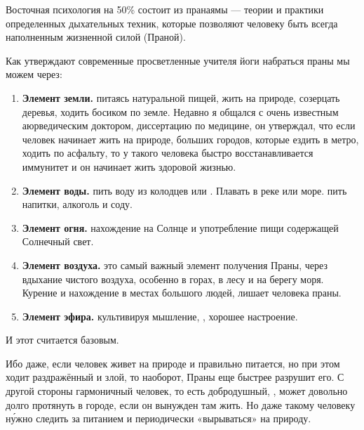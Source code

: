 Восточная психология на 50\% состоит из пранаямы --- теории и практики определенных дыхательных техник, которые позволяют человеку быть всегда наполненным жизненной силой (Праной).

Как утверждают современные просветленные учителя йоги набраться праны мы можем через:
\begin{enumerate}
    \item \textbf{Элемент земли.} питаясь натуральной пищей, жить на природе, созерцать деревья, ходить босиком по земле. Недавно я общался с очень известным аюрведическим доктором,  диссертацию по медицине, он утверждал, что если человек начинает жить на природе,  больших городов, которые  ездить в метро, ходить по асфальту, то у такого человека быстро восстанавливается иммунитет и он начинает жить здоровой жизнью.

    \item \textbf{Элемент воды.} пить воду из колодцев или . Плавать в реке или море.  пить  напитки, алкоголь и соду.

    \item \textbf{Элемент огня.} нахождение на Солнце и употребление пищи содержащей Солнечный свет.

    \item  \textbf{Элемент воздуха.} это самый важный элемент получения Праны, через вдыхание чистого воздуха, особенно в горах, в лесу и на берегу моря. Курение и нахождение в местах большого  людей, лишает человека праны.

    \item \textbf{Элемент эфира.} культивируя  мышление, , хорошее настроение.
\end{enumerate}


И этот  считается базовым.

Ибо даже, если человек живет на природе и правильно питается, но при этом ходит раздражённый и злой, то наоборот,  Праны еще быстрее разрушит его.
С другой стороны гармоничный человек, то есть добродушный,
, может довольно долго протянуть в городе,
если он вынужден там жить.
Но даже такому человеку н\'{у}жно следить за питанием
и периодически «вырываться» на природу.

